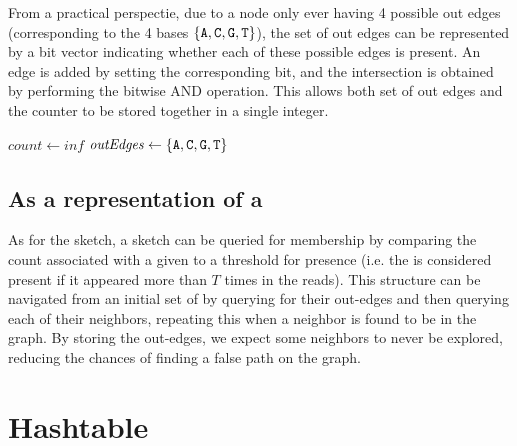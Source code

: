\begin{algorithm}[htbp]
    \caption{$\mathit{addOutEdge}(\text{k-mer}, \mathit{outEdge})$}\label{alg:addOutEdge}
\end{algorithm}

From a practical perspectie, due to a node only ever having 4 possible out edges (corresponding to the 4 bases $\{\mathtt{A}, \mathtt{C}, \mathtt{G}, \mathtt{T}\}$),
the set of out edges can be represented by a bit vector indicating whether each of these possible edges is present. An edge is added
by setting the corresponding bit, and the intersection is obtained by performing the bitwise AND operation. This allows both set of
out edges and the counter to be stored together in a single integer.

\begin{algorithm}
    \caption{$\mathit{query}(\text{k-mer})$}\label{alg:query}
    $\mathit{count} \gets \mathit{inf}$\;
    $\mathit{outEdges} \gets \{\mathtt{A}, \mathtt{C}, \mathtt{G}, \mathtt{T}\}$\;
\end{algorithm}

\subsection{As a representation of a \dBG}

As for the \cm sketch, a \dBCM sketch can be queried for membership by comparing the count associated with a given \kmer to a threshold
for presence (i.e. the \kmer is considered present if it appeared more than $T$ times in the reads). This structure can be navigated from
an initial set of \kmers by querying for their out-edges and then querying each of their neighbors, repeating this when a neighbor is
found to be in the graph. By storing the out-edges, we expect some neighbors to never be explored, reducing the chances of finding
a false path on the graph.

\section{Hashtable}
\label{sec:debruijnhashtable}

